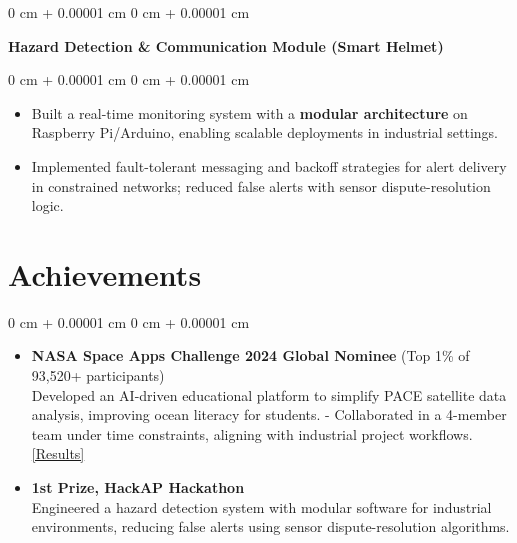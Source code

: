\documentclass[10pt, letterpaper]{article}
\newenvironment{highlights}{ \begin{itemize}[ topsep=0.10 cm, parsep=0.10 cm, partopsep=0pt,
itemsep=0pt, leftmargin=0 cm + 10pt ] }{ \end{itemize} } %
\newenvironment{onecolentry}{ \begin{adjustwidth}{ 0 cm + 0.00001 cm }{ 0 cm + 0.00001 cm }
}{ \end{adjustwidth} } %
\begin{document}
\vspace{0.10 cm}
\begin{onecolentry}
		\textbf{Hazard Detection \& Communication Module (Smart Helmet)
} 
\end{onecolentry}
\begin{onecolentry}
	\begin{highlights}
	\vspace{0.10 cm}
		\item Built a real-time monitoring system with a \textbf{modular architecture} on Raspberry Pi/Arduino, enabling scalable deployments in industrial settings. \\
		\item Implemented fault-tolerant messaging and backoff strategies for alert delivery in constrained networks; reduced false alerts with sensor dispute-resolution logic.
	\end{highlights}
\end{onecolentry}


\section{Achievements}
\begin{onecolentry}
    \begin{highlights}
        \item \textbf{NASA Space Apps Challenge 2024 Global Nominee} (Top 1\% of 93,520+ participants)
        \vspace{0.1cm}
        \\Developed an AI-driven educational platform to simplify PACE satellite data analysis, improving ocean literacy for students. 
        - Collaborated in a 4-member team under time constraints, aligning with industrial project workflows.  
        \href{https://www.spaceappschallenge.org/nasa-space-apps-2024/find-a-team/cosmic-ninjas/}{[Results]}
        
        \item \textbf{1st Prize, HackAP Hackathon}\\\vspace{0.1cm}Engineered a hazard detection system with modular software for industrial environments, reducing false alerts using sensor dispute-resolution algorithms.
    \end{highlights}
\end{onecolentry}
\end{document}
